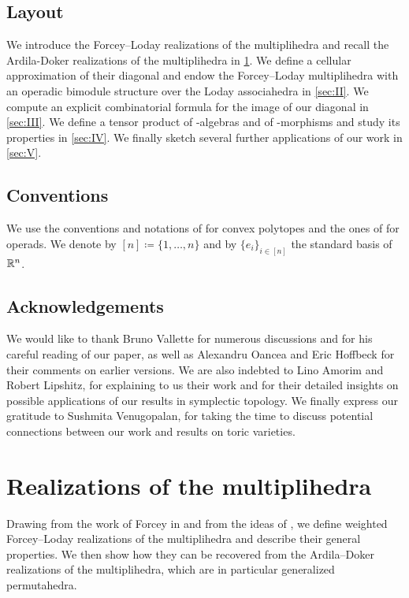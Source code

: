 \documentclass[twoside, 11pt]{amsart}
\theoremstyle{remark}
\begin{document}
\subsection*{Layout} 
We introduce the Forcey--Loday realizations of the multiplihedra and recall the Ardila-Doker realizations of the multiplihedra in \cref{sec:I}. 
We define a cellular approximation of their diagonal and endow the Forcey--Loday multiplihedra with an operadic bimodule structure over the Loday associahedra in \cref{sec:II}.
We compute an explicit combinatorial formula for the image of our diagonal in \cref{sec:III}. 
We define a tensor product of \Ainf -algebras and of \Ainf -morphisms and study its properties in \cref{sec:IV}.
We finally sketch several further applications of our work in \cref{sec:V}.

\subsection*{Conventions} We use the conventions and notations of \cite{Ziegler95} for convex polytopes and the ones of \cite{LodayVallette12} for operads. We denote by $[n]\coloneqq \{1,\ldots,n\}$ and by $\{ e_i\}_{i \in [n]}$ the standard basis of $\mathbb{R}^n$.

\subsection*{Acknowledgements} 
We would like to thank Bruno Vallette for numerous discussions and for his careful reading of our paper, as well as Alexandru Oancea and Eric Hoffbeck for their comments on earlier versions.
We are also indebted to Lino Amorim and Robert Lipshitz, for explaining to us their work and for their detailed insights on possible applications of our results in symplectic topology. We finally express our gratitude to Sushmita Venugopalan, for taking the time to discuss potential connections between our work and results on toric varieties.



\section{Realizations of the multiplihedra} 
\label{sec:I}


Drawing from the work of Forcey in \cite{Forcey08} and from the ideas of \cite{MTTV19}, we define weighted Forcey--Loday realizations of the multiplihedra and describe their general properties.
We then show how they can be recovered from the Ardila--Doker realizations of the multiplihedra, which are in particular generalized permutahedra.
\end{document}

